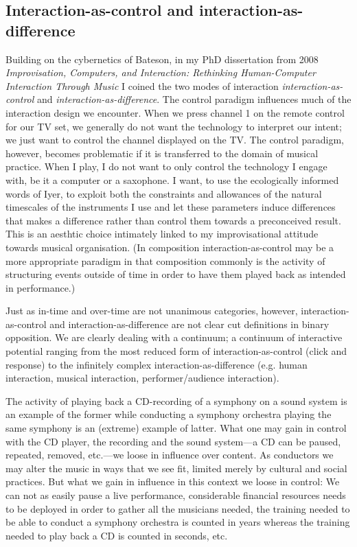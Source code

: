 \documentclass{article}
\begin{document}
\subsection{Interaction-as-control and interaction-as-difference}
\label{sec:inter-as-contr}

Building on the cybernetics of Bateson, in my PhD dissertation from 2008 \emph{Improvisation, Computers, and Interaction: Rethinking Human-Computer Interaction Through Music} \cite{frisk08} I coined the two modes of interaction \emph{interaction-as-control} and \emph{interaction-as-difference}. The control paradigm influences much of the interaction design we encounter. When we press channel 1 on the remote control for our TV set, we generally do not want the technology to interpret our intent; we just want to control the channel displayed on the TV. The control paradigm, however, becomes problematic if it is transferred to the domain of musical practice. When I play, I do not want to only control the technology I engage with, be it a computer or a saxophone. I want, to use the ecologically informed words of Iyer, to exploit both the constraints and allowances of the natural timescales of the instruments I use and let these parameters induce differences that makes a difference rather than control them towards a preconceived result. This is an aesthtic choice intimately linked to my improvisational attitude towards musical organisation. (In composition interaction-as-control may be a more appropriate paradigm in that composition commonly is the activity of structuring events outside of time in order to have them played back as intended in performance.)


Just as in-time and over-time are not unanimous categories, however, interaction-as-control and interaction-as-difference are not clear cut definitions in binary opposition. We are clearly dealing with a continuum; a continuum of interactive potential ranging from the most reduced form of interaction-as-control (click and response) to the infinitely complex interaction-as-difference (e.g. human interaction, musical interaction, performer/audience interaction). 

The activity of playing back a CD-recording of a symphony on a sound system is an example of the former while conducting a symphony orchestra playing the same symphony is an (extreme) example of latter. What one may gain in control with the CD player, the recording and the sound system---a CD can be paused, repeated, removed, etc.---we loose in influence over content. 
As conductors we may alter the music in ways that we see fit, limited merely by cultural and social practices. But what we gain in influence in this context we loose in control: We can not as easily pause a live performance, considerable financial resources needs to be deployed in order to gather all the musicians needed, the training needed to be able to conduct a symphony orchestra is counted in years whereas the training needed to play back a CD is counted in seconds, etc. 
\end{document}
